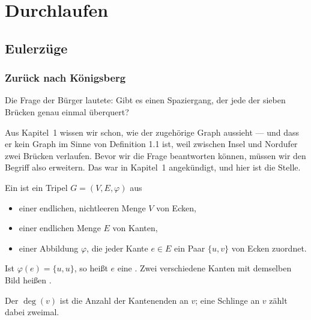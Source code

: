 \part{Durchlaufen}

\chapter{Eulerzüge}

\section{Zurück nach Königsberg}

Die Frage der Bürger lautete: Gibt es einen Spaziergang, der jede der sieben Brücken genau einmal überquert?

Aus Kapitel~1 wissen wir schon, wie der zugehörige Graph aussieht --- und dass er kein Graph im Sinne von Definition 1.1 ist, weil zwischen Insel und Nordufer zwei Brücken verlaufen. Bevor wir die Frage beantworten können, müssen wir den Begriff also erweitern. Das war in Kapitel~1 angekündigt, und hier ist die Stelle.

\begin{definition}
Ein  ist ein Tripel $G = (V, E, \varphi)$ aus
\begin{itemize}[leftmargin=1.4em, itemsep=3pt]
\item einer endlichen, nichtleeren Menge $V$ von Ecken,
\item einer endlichen Menge $E$ von Kanten,
\item einer Abbildung $\varphi$, die jeder Kante $e \in E$ ein Paar $\{u,v\}$ von Ecken zuordnet.
\end{itemize}
Ist $\varphi(e) = \{u,u\}$, so heißt $e$ eine . Zwei verschiedene Kanten mit demselben Bild heißen .

Der  $\deg(v)$ ist die Anzahl der Kantenenden an $v$; eine Schlinge an $v$ zählt dabei zweimal.
\end{definition}

